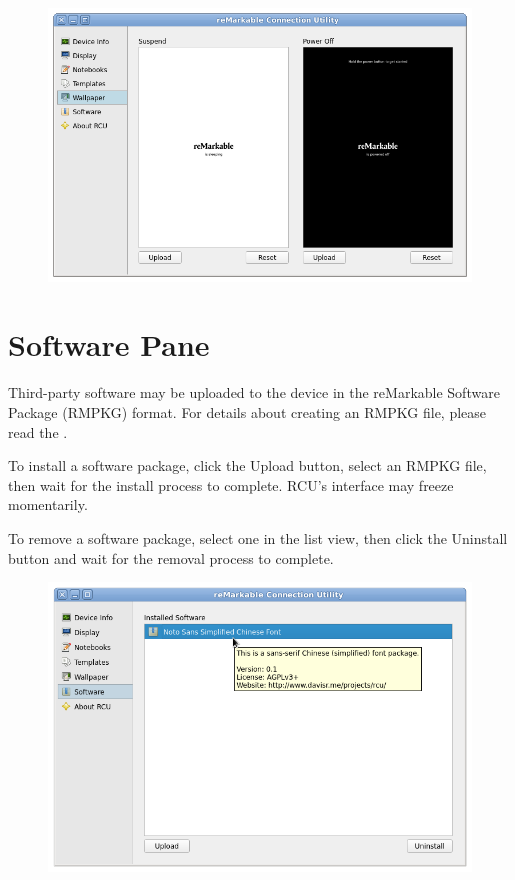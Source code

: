 \documentclass{memoir}
\begin{document}
{\vfill
\begin{figure}[h]
  \centering
  \includegraphics[width=\linewidth]{images/wallpaper.png}
  \caption{}
  \label{fig:wallpaperpane}
\end{figure}


\newpage
\section{Software Pane}
\label{sec:softwarepane}
Third-party software may be uploaded to the device in the reMarkable Software Package (RMPKG) format. For details about creating an RMPKG file, please read the .

To install a software package, click the Upload button, select an RMPKG file, then wait for the install process to complete. RCU's interface may freeze momentarily.

To remove a software package, select one in the list view, then click the Uninstall button and wait for the removal process to complete.

\vfill
\begin{figure}[h]
  \centering
  \includegraphics[width=\linewidth]{images/software.png}
  \caption{}
  \label{fig:softwarepane}
\end{figure}


}
\end{document}
